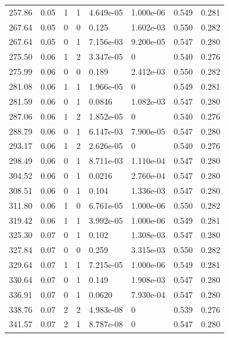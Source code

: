 \documentclass[preview]{standalone}
\begin{document}
{{{\begin{tabular}{L{1.2cm}C{1.2cm} C{0.3cm}C{0.5cm} C{1.4cm}C{1.4cm} C{1.4cm}C{1.4cm}}
  257.86  &  0.05  & 1     &  1 &  4.649e-05  & 1.000e-06  & 0.549 &  0.281   \\ 
  267.64  &  0.05  & 0     &  0 &  0.125  & 1.602e-03  & 0.550 &  0.282   \\ 
  267.64  &  0.05  & 0     &  1 &  7.156e-03  & 9.200e-05  & 0.547 &  0.280   \\ 
  275.50  &  0.06  & 1     &  2 &  3.347e-05  & 0  & 0.540 &  0.276   \\ 
  275.99  &  0.06  & 0     &  0 &  0.189  & 2.412e-03  & 0.550 &  0.282   \\ 
  281.08  &  0.06  & 1     &  1 &  1.966e-05  & 0  & 0.549 &  0.281   \\ 
  281.59  &  0.06  & 0     &  1 &  0.0846  & 1.082e-03  & 0.547 &  0.280   \\ 
  287.06  &  0.06  & 1     &  2 &  1.852e-05  & 0  & 0.540 &  0.276   \\ 
  288.79  &  0.06  & 0     &  1 &  6.147e-03  & 7.900e-05  & 0.547 &  0.280   \\ 
  293.17  &  0.06  & 1     &  2 &  2.626e-05  & 0  & 0.540 &  0.276   \\ 
  298.49  &  0.06  & 0     &  1 &  8.711e-03  & 1.110e-04  & 0.547 &  0.280   \\ 
  304.52  &  0.06  & 0     &  1 &  0.0216  & 2.760e-04  & 0.547 &  0.280   \\ 
  308.51  &  0.06  & 0     &  1 &  0.104  & 1.336e-03  & 0.547 &  0.280   \\ 
  311.80  &  0.06  & 1     &  0 &  6.761e-05  & 1.000e-06  & 0.550 &  0.282   \\ 
  319.42  &  0.06  & 1     &  1 &  3.992e-05  & 1.000e-06  & 0.549 &  0.281   \\ 
  325.30  &  0.07  & 0     &  1 &  0.102  & 1.308e-03  & 0.547 &  0.280   \\ 
  327.84  &  0.07  & 0     &  0 &  0.259  & 3.315e-03  & 0.550 &  0.282   \\ 
  329.64  &  0.07  & 1     &  1 &  7.215e-05  & 1.000e-06  & 0.549 &  0.281   \\ 
  330.64  &  0.07  & 0     &  1 &  0.149  & 1.908e-03  & 0.547 &  0.280   \\ 
  336.91  &  0.07  & 0     &  1 &  0.0620  & 7.930e-04  & 0.547 &  0.280   \\ 
  338.76  &  0.07  & 2     &  2 &  4.983e-08  & 0  & 0.539 &  0.276   \\ 
  341.57  &  0.07  & 2     &  1 &  8.787e-08  & 0  & 0.547 &  0.280   \\ 

\end{tabular}}}}
\end{document}
